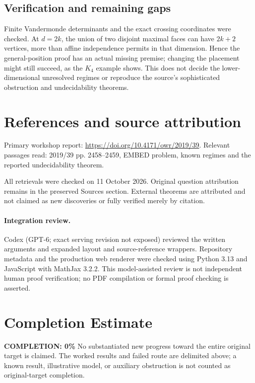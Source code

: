 \documentclass[11pt]{article}
\begin{document}
\subsection{Verification and remaining gaps}
Finite Vandermonde determinants and the exact crossing coordinates were checked. At $d=2k$, the union of two disjoint maximal faces can have $2k+2$ vertices, more than affine independence permits in that dimension. Hence the general-position proof has an actual missing premise; changing the placement might still succeed, as the $K_4$ example shows. This does not decide the lower-dimensional unresolved regimes or reproduce the source's sophisticated obstruction and undecidability theorems.

\section{References and source attribution}
Primary workshop report: \url{https://doi.org/10.4171/owr/2019/39}. Relevant passages read: 2019/39 pp. 2458--2459, EMBED problem, known regimes and the reported undecidability theorem.

All retrievals were checked on 11 October 2026. Original question attribution remains in the preserved Sources section. External theorems are attributed and not claimed as new discoveries or fully verified merely by citation.


\paragraph{Integration review.} Codex (GPT-6; exact serving revision not exposed) reviewed the written arguments and expanded layout and source-reference wrappers. Repository metadata and the production web renderer were checked using Python 3.13 and JavaScript with MathJax 3.2.2. This model-assisted review is not independent human proof verification; no PDF compilation or formal proof checking is asserted.

\section{Completion Estimate}
\noindent\textbf{COMPLETION: 0\%}
No substantiated new progress toward the entire original target is claimed. The worked results and failed route are delimited above; a known result, illustrative model, or auxiliary obstruction is not counted as original-target completion.
\end{document}
